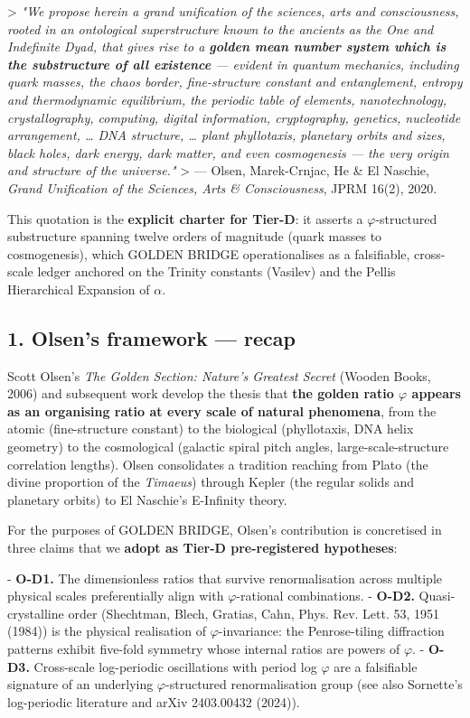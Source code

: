 > \textit{"We propose herein a grand unification of the sciences, arts and consciousness, rooted in an ontological superstructure known to the ancients as the One and Indefinite Dyad, that gives rise to a \textbf{golden mean number system which is the substructure of all existence} --- evident in quantum mechanics, including quark masses, the chaos border, fine-structure constant and entanglement, entropy and thermodynamic equilibrium, the periodic table of elements, nanotechnology, crystallography, computing, digital information, cryptography, genetics, nucleotide arrangement, … DNA structure, … plant phyllotaxis, planetary orbits and sizes, black holes, dark energy, dark matter, and even cosmogenesis --- the very origin and structure of the universe."}
> --- Olsen, Marek-Crnjac, He \& El Naschie, \textit{Grand Unification of the Sciences, Arts \& Consciousness}, JPRM 16(2), 2020.

This quotation is the \textbf{explicit charter for Tier-D}: it asserts a $\varphi$-structured substructure spanning twelve orders of magnitude (quark masses to cosmogenesis), which GOLDEN BRIDGE operationalises as a falsifiable, cross-scale ledger anchored on the Trinity constants (Vasilev) and the Pellis Hierarchical Expansion of $\alpha$.

\subsection{1. Olsen's framework --- recap}

Scott Olsen's \textit{The Golden Section: Nature's Greatest Secret} (Wooden Books, 2006) and subsequent work develop the thesis that \textbf{the golden ratio $\varphi$ appears as an organising ratio at every scale of natural phenomena}, from the atomic (fine-structure constant) to the biological (phyllotaxis, DNA helix geometry) to the cosmological (galactic spiral pitch angles, large-scale-structure correlation lengths). Olsen consolidates a tradition reaching from Plato (the divine proportion of the \textit{Timaeus}) through Kepler (the regular solids and planetary orbits) to El Naschie's E-Infinity theory.

For the purposes of GOLDEN BRIDGE, Olsen's contribution is concretised in three claims that we \textbf{adopt as Tier-D pre-registered hypotheses}:

- \textbf{O-D1.} The dimensionless ratios that survive renormalisation across multiple physical scales preferentially align with $\varphi$-rational combinations.
- \textbf{O-D2.} Quasi-crystalline order (Shechtman, Blech, Gratias, Cahn, Phys. Rev. Lett. 53, 1951 (1984)) is the physical realisation of $\varphi$-invariance: the Penrose-tiling diffraction patterns exhibit five-fold symmetry whose internal ratios are powers of $\varphi$.
- \textbf{O-D3.} Cross-scale log-periodic oscillations with period log $\varphi$ are a falsifiable signature of an underlying $\varphi$-structured renormalisation group (see also Sornette's log-periodic literature and arXiv 2403.00432 (2024)).

